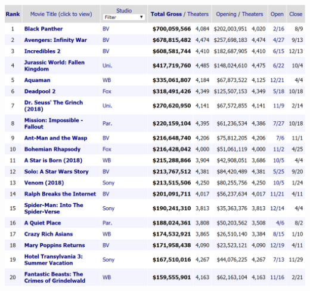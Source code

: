 \documentclass[12pt]{article}
\begin{document}
\vspace{1cm}
\includegraphics[width=\textwidth]{Topfilms.png}
\end{document}
